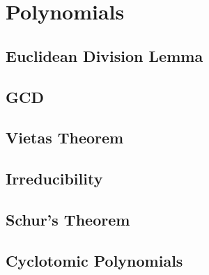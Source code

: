 \chapter{Polynomials}
\section{Euclidean Division Lemma}
\section{GCD}
\section{Vietas Theorem}
\section{Irreducibility}
\section{Schur's Theorem}
\section{Cyclotomic Polynomials}
